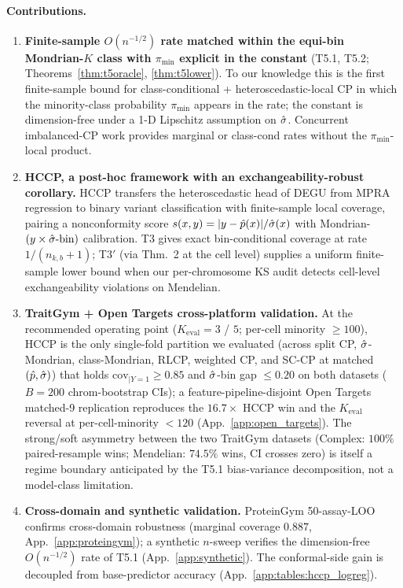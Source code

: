 \paragraph{Contributions.}
\begin{enumerate}
    \item \textbf{Finite-sample $O(n^{-1/2})$ rate matched within the equi-bin Mondrian-$K$ class with $\pi_{\min}$ explicit in the constant} (T5.1, T5.2; Theorems~\ref{thm:t5oracle}, \ref{thm:t5lower}). To our knowledge this is the first finite-sample bound for class-conditional + heteroscedastic-local CP in which the minority-class probability $\pi_{\min}$ appears in the rate; the constant is dimension-free under a 1-D Lipschitz assumption on $\hat{\sigma}$. Concurrent imbalanced-CP work \citep{xie2025imbalancedcp,ding2023classcond,shi2024augmentedrank} provides marginal or class-cond rates without the $\pi_{\min}$-local product.
    \item \textbf{HCCP, a post-hoc framework with an exchangeability-robust corollary.} HCCP transfers the heteroscedastic head of DEGU from MPRA regression to binary variant classification with finite-sample local coverage, pairing a nonconformity score $s(x,y) = |y - \hat{p}(x)| / \hat{\sigma}(x)$ with Mondrian-$(y \times \hat{\sigma}\text{-bin})$ calibration. T3 gives exact bin-conditional coverage at rate $1/(n_{k,b}+1)$; T3$'$ (via \citet{barber2023exchangeability} Thm.~2 at the cell level) supplies a uniform finite-sample lower bound when our per-chromosome KS audit detects cell-level exchangeability violations on Mendelian.
    \item \textbf{TraitGym + Open Targets cross-platform validation.} At the recommended operating point ($K_{\mathrm{eval}} = 3$ / $5$; per-cell minority $\geq 100$), HCCP is the only single-fold partition we evaluated (across split CP, $\hat{\sigma}$-Mondrian, class-Mondrian, RLCP, weighted CP, and SC-CP at matched $(\hat{p}, \hat{\sigma})$) that holds $\mathrm{cov}_{|Y=1} \geq 0.85$ and $\hat{\sigma}$-bin gap $\leq 0.20$ on both datasets ($B=200$ chrom-bootstrap CIs); a feature-pipeline-disjoint Open Targets matched-9 replication \citep{ochoa2023opentargets} reproduces the $16.7\times$ HCCP win and the $K_{\mathrm{eval}}$ reversal at per-cell-minority $< 120$ (App.~\ref{app:open_targets}). The strong/soft asymmetry between the two TraitGym datasets (Complex: $100\%$ paired-resample wins; Mendelian: $74.5\%$ wins, CI crosses zero) is itself a regime boundary anticipated by the T5.1 bias-variance decomposition, not a model-class limitation.
    \item \textbf{Cross-domain and synthetic validation.} ProteinGym \citep{notin2023proteingym} 50-assay-LOO confirms cross-domain robustness (marginal coverage $0.887$, App.~\ref{app:proteingym}); a synthetic $n$-sweep verifies the dimension-free $O(n^{-1/2})$ rate of T5.1 (App.~\ref{app:synthetic}). The conformal-side gain is decoupled from base-predictor accuracy (App.~\ref{app:tables:hccp_logreg}).
\end{enumerate}
